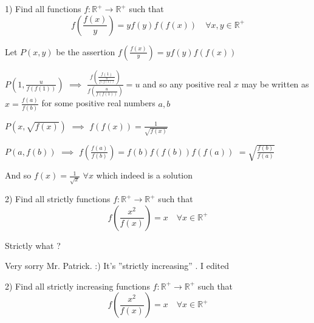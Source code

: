 \begin{solution}
	\begin{tcolorbox}1) Find all functions $f:\mathbb{R}^+\to\mathbb{R}^+$ such that
\[f\left ( \frac{f(x)}{y} \right )=yf(y)f(f(x))\quad \forall x,y\in \mathbb{R}^+\]\end{tcolorbox}
Let $P(x,y)$ be the assertion $f\left(\frac {f(x)}y\right)=yf(y)f(f(x))$

$P(1,\frac u{f(f(1))})$ $\implies$ $\frac{f\left(\frac {f(1)}{\frac u{f(f(1))}}\right)}{f(\frac u{f(f(1))})}=u$ 
and so any positive real $x$ may be written as $x=\frac{f(a)}{f(b)}$ for some positive real numbers $a,b$

$P(x,\sqrt{f(x)})$ $\implies$ $f(f(x))=\frac 1{\sqrt{f(x)}}$

$P(a,f(b))$ $\implies$ $f\left(\frac{f(a)}{f(b)}\right)=f(b)f(f(b))f(f(a))$ $=\sqrt{\frac{f(b)}{f(a)}}$

And so $\boxed{f(x)=\frac 1{\sqrt x}}$ $\forall x$ which indeed is a solution
\end{solution}



\begin{solution}
	\begin{tcolorbox}2) Find all strictly functions $f:\mathbb{R}^+\to\mathbb{R}^+$ such that
\[f\left ( \frac{x^2}{f(x)} \right )=x \quad \forall x\in \mathbb{R}^+\]\end{tcolorbox}
Strictly what ?
\end{solution}



\begin{solution}
	Very sorry Mr. Patrick. :) 
It's  ''strictly increasing'' . I edited

2) Find all strictly increasing functions $f:\mathbb{R}^+\to\mathbb{R}^+$ such that
\[f\left ( \frac{x^2}{f(x)} \right )=x \quad \forall x\in \mathbb{R}^+\]
\end{solution}



